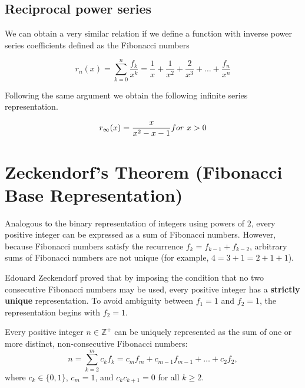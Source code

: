\documentclass[a4paper]{article}
\begin{document}
\subsection{Reciprocal power series}\label{fib:subsec:reciprocal-power-series}
We can obtain a very similar relation if we define a function with inverse power series coefficients defined as the Fibonacci numbers

\begin{equation}
r_n(x) = \sum_{k=0}^{n} \frac{f_k}{x^k} = \frac{1}{x} + \frac{1}{x^2} + \frac{2}{x^3} + \dots + \frac{f_n}{x^n}
\label{fib:eq:equation21}
\end{equation}

Following the same argument we obtain the following infinite series representation.

\begin{equation}
r_{\infty}(x) = \frac{x}{x^2 - x - 1} for \ x>0 \\
\label{fib:eq:equation22}
\end{equation}


\section{Zeckendorf's Theorem (Fibonacci Base Representation)}\label{fib:sec:base-fibonacci}

Analogous to the binary representation of integers using powers of $2$, every positive integer can be expressed as a sum of Fibonacci numbers. However, because Fibonacci numbers satisfy the recurrence $f_k = f_{k-1} + f_{k-2}$, arbitrary sums of Fibonacci numbers are not unique (for example, $4 = 3 + 1 = 2 + 1 + 1$). 

Edouard Zeckendorf proved that by imposing the condition that no two consecutive Fibonacci numbers may be used, every positive integer has a \textbf{strictly unique} representation. To avoid ambiguity between $f_1 = 1$ and $f_2 = 1$, the representation begins with $f_2 = 1$.

\begin{theorem}\label{fib:thm:zeckendorf}
Every positive integer $n \in \mathbb{Z}^+$ can be uniquely represented as the sum of one or more distinct, non-consecutive Fibonacci numbers:
\begin{equation}
n = \sum_{k=2}^{m} c_k f_k = c_m f_m + c_{m-1} f_{m-1} + \dots + c_2 f_2,
\end{equation}
where $c_k \in \{0, 1\}$, $c_m = 1$, and $c_k c_{k+1} = 0$ for all $k \geq 2$.
\end{theorem}
\end{document}
